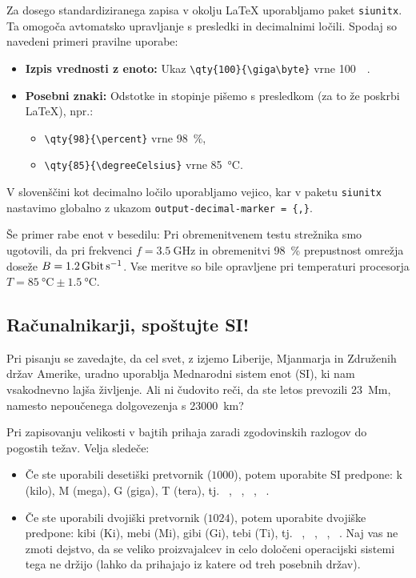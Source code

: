 \documentclass[a4paper,12pt,openright]{book}
\begin{document}
Za dosego standardiziranega zapisa v okolju \LaTeX{} uporabljamo paket \texttt{siunitx}. Ta omogoča avtomatsko upravljanje s presledki in decimalnimi ločili. Spodaj so navedeni primeri pravilne uporabe:

\begin{itemize}
    \item \textbf{Izpis vrednosti z enoto:} Ukaz \verb|\qty{100}{\giga\byte}| vrne \qty{100}{\giga\byte}.
    \item \textbf{Posebni znaki:} Odstotke in stopinje pišemo s presledkom (za to že poskrbi \LaTeX), npr.:
    \begin{itemize}
         \item\verb|\qty{98}{\percent}| vrne \qty{98}{\percent},
         \item\verb|\qty{85}{\degreeCelsius}| vrne \qty{85}{\degreeCelsius}.
     \end{itemize}
\end{itemize}

V slovenščini kot decimalno ločilo uporabljamo vejico, kar v paketu \texttt{siunitx} nastavimo globalno z ukazom \texttt{output-decimal-marker = \{,\}}.

Še primer rabe enot v besedilu: Pri obremenitvenem testu strežnika smo ugotovili, da pri frekvenci $f = \qty{3,5}{\giga\hertz}$ in obremenitvi \qty{98}{\percent} prepustnost omrežja doseže $B = \qty{1,2}{\giga\bit\per\second}$. Vse meritve so bile opravljene pri temperaturi procesorja $T = \qty{85}{\degreeCelsius} \pm \qty{1,5}{\degreeCelsius}$.

\subsection{Računalnikarji, spoštujte SI!}
Pri pisanju se zavedajte, da cel svet, z izjemo Liberije, Mjanmarja in Združenih držav Amerike, uradno uporablja Mednarodni sistem enot (SI), ki nam vsakodnevno lajša življenje. Ali ni čudovito reči, da ste letos prevozili \qty{23}{\mega\meter}, namesto nepoučenega dolgovezenja s \qty{23000}{\kilo\meter}?

Pri zapisovanju velikosti v bajtih prihaja zaradi zgodovinskih razlogov do pogostih težav. Velja sledeče:
\begin{itemize}
\item Če ste uporabili desetiški pretvornik ($1000$), potem uporabite SI predpone: k (kilo), M (mega), G (giga), T (tera), tj. \unit{\kilo\byte}, \unit{\mega\byte}, \unit{\giga\byte}, \unit{\tera\byte}.
\item Če ste uporabili dvojiški pretvornik ($1024$), potem uporabite dvojiške predpone: 
kibi (\unit{Ki}), mebi (\unit{Mi}), gibi (\unit{Gi}), tebi (\unit{Ti}), 
tj. \unit{\kibi\byte}, \unit{\mebi\byte}, \unit{\gibi\byte}, \unit{\tebi\byte}. 
Naj vas ne zmoti dejstvo, da se veliko proizvajalcev in celo določeni operacijski 
sistemi tega ne držijo (lahko da prihajajo iz katere od treh posebnih držav).
\end{itemize}
\end{document}

